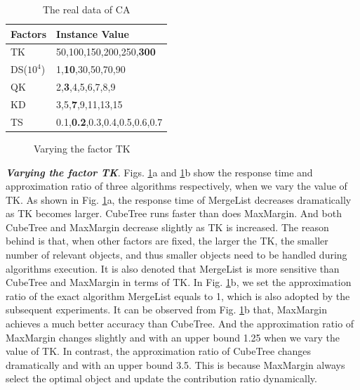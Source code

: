 \begin{table}[h]
\centering
\begin{tabular}{|l|l|}
\hline
Factors & Instance Value \\
\hline
TK & 50,100,150,200,250,\textbf{300} \\
\hline
DS($10^4$) & 1,\textbf{10},30,50,70,90\\
\hline
QK & 2,\textbf{3},4,5,6,7,8,9 \\
\hline
KD & 3,5,\textbf{7},9,11,13,15 \\
\hline
TS & 0.1,\textbf{0.2},0.3,0.4,0.5,0.6,0.7 \\
\hline
\end{tabular}
\caption{The real data of CA}
\label{T6}
\end{table}

\begin{figure}[h] \centering
\caption{Varying the factor TK}
\label{F4}
\end{figure}

\textbf{\textit{Varying the factor TK}}. Figs. \ref{F4}a and \ref{F4}b show the response time and approximation ratio of three algorithms respectively, when we vary the value of TK. As shown in Fig. \ref{F4}a, the response time of MergeList decreases dramatically as TK becomes larger. CubeTree runs faster than does MaxMargin. And both CubeTree and MaxMargin decrease slightly as TK is increased. The reason behind is that, when other factors are fixed, the larger the TK, the smaller number of relevant objects, and thus smaller objects need to be handled during algorithms execution. It is also denoted that MergeList is more sensitive than CubeTree and MaxMargin in terms of TK. In Fig. \ref{F4}b, we set the approximation ratio of the exact algorithm MergeList equals to 1, which is also adopted by the subsequent experiments. It can be observed from Fig. \ref{F4}b that, MaxMargin achieves a much better accuracy than CubeTree. And the approximation ratio of MaxMargin changes slightly and with an upper bound 1.25 when we vary the value of TK. In contrast, the approximation ratio of CubeTree changes dramatically and with an upper bound 3.5. This is because MaxMargin always select the optimal object and update the contribution ratio dynamically.

